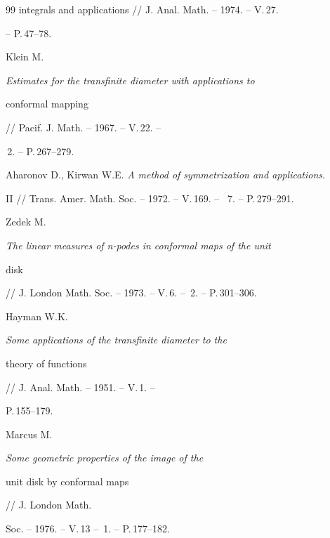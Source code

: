 \begin{thebibliography}{99}
{integrals and applications} // J. Anal. Math. -- 1974. -- V.\,27.


-- P.\,47--78. 




Klein M. {\it Estimates for the transfinite diameter with applications to


conformal mapping} // Pacif. J. Math. -- 1967. -- V.\,22. --


\No\,2. -- P.\,267--279.




Aharonov D., Kirwan W.E. {\it A method of symmetrization and applications}.


II // Trans. Amer. Math. Soc. -- 1972. -- V.\,169. -- \No\, 7. -- P.\,279--291.




Zedek M. {\it The linear measures of n-podes in conformal maps of the unit


disk} // J. London Math. Soc. -- 1973. -- V.\,6. -- \No\,2. -- P.\,301--306.




Hayman W.K. {\it Some applications of the transfinite diameter to the


theory of functions} // J. Anal. Math. -- 1951. -- V.\,1. --


P.\,155--179.




Marcus M. {\it Some geometric properties of the image of the 


unit disk by conformal maps} // J. London Math.


Soc. -- 1976. -- V.\,13 -- \No\,1. -- P.\,177--182.





\end{thebibliography}





\vskip 2cm












\label{end}








